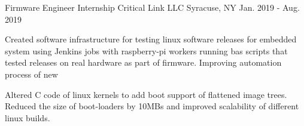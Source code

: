 \begin{cventries}
  \cventry
    {Firmware Engineer Internship} %
    {Critical Link LLC} %
    {Syracuse, NY} %
    {Jan. 2019 - Aug. 2019} %
    {
      \begin{cvitems} %
        \item {Created software infrastructure for testing linux software releases for embedded system using Jenkins jobs with raspberry-pi workers running bas scripts that tested releases on real hardware as part of firmware. Improving automation process of new }
        \item {Altered C code of linux kernels to add boot support of flattened image trees. Reduced the size of boot-loaders by 10MBs and improved scalability of different linux builds.}
      \end{cvitems}
    }


\end{cventries}
